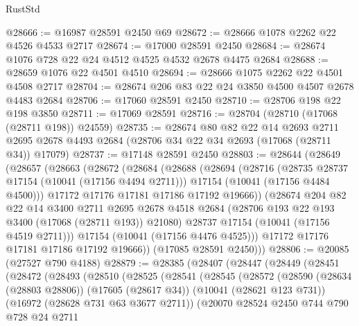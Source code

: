 \begin{lexlean}{RustStd}
\begin{coremodule}
@28666 := @16987 @28591 @2450 @69
@28672 := @28666 @1078 @2262 @22 @4526 @4533 @2717
@28674 := @17000 @28591 @2450
@28684 := @28674 @1076 @728 @22 @24 @4512 @4525 @4532 @2678 @4475 @2684
@28688 := @28659 @1076 @22 @4501 @4510
@28694 := @28666 @1075 @2262 @22 @4501 @4508 @2717
@28704 := @28674 @206 @83 @22 @24 @3850 @4500 @4507 @2678 @4483 @2684
@28706 := @17060 @28591 @2450
@28710 := @28706 @198 @22 @198 @3850
@28711 := @17069 @28591
@28716 := @28704 (@28710 (@17068 (@28711 @198)) @24559)
@28735 := @28674
    @80
    @82
    @22
    @14
    @2693
    @2711
    @2695
    @2678
    @4493
    @2684
    (@28706 @34 @22 @34 @2693 (@17068 (@28711 @34)) @17079)
@28737 := @17148 @28591 @2450
@28803 := @28644
    (@28649
      (@28657
        (@28663
          (@28672
            (@28684
              (@28688
                (@28694
                  (@28716
                    (@28735 @28737 @17154 (@10041 (@17156 @4494 @2711)))
                    @17154
                    (@10041 (@17156 @4484 @4500)))
                  @17172
                  @17176
                  @17181
                  @17186
                  @17192
                  @19666))
              (@28674
                @204
                @82
                @22
                @14
                @3400
                @2711
                @2695
                @2678
                @4518
                @2684
                (@28706 @193 @22 @193 @3400 (@17068 (@28711 @193)) @21080)
                @28737
                @17154
                (@10041 (@17156 @4519 @2711)))
              @17154
              (@10041 (@17156 @4476 @4525)))
            @17172
            @17176
            @17181
            @17186
            @17192
            @19666))
        (@17085 @28591 @2450)))
@28806 := @20085 (@27527 @790 @4188)
@28879 := @28385
    (@28407
      (@28447
        (@28449
          (@28451
            (@28472
              (@28493
                (@28510
                  (@28525
                    (@28541
                      (@28545
                        (@28572
                          (@28590
                            (@28634 (@28803 @28806))
                            (@17605 (@28617 @34))
                            (@10041 (@28621 @123 @731))
                            (@16972 (@28628 @731 @63 @3677 @2711))
                            (@20070
                              @28524
                              @2450
                              @744
                              @790
                              @728
                              @24
                              @2711

\end{coremodule}
\end{lexlean}
